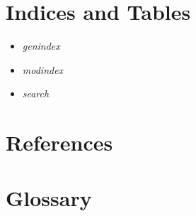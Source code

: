 \documentclass[letterpaper,10pt,english]{sphinxmanual}
\begin{document}
\chapter{Indices and Tables}
\label{index:indices-and-tables}\begin{itemize}
\item {} 
\emph{genindex}

\item {} 
\emph{modindex}

\item {} 
\emph{search}

\end{itemize}


\chapter{References}
\label{index:references}

\chapter{Glossary}
\label{index:glossary}
\end{document}
